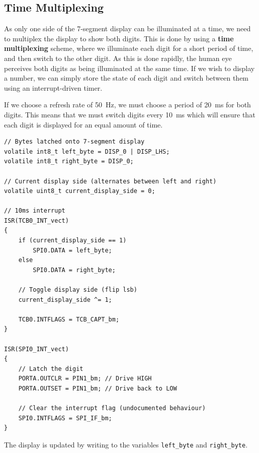 \documentclass[a4paper]{report}
\begin{document}
\subsection{Time Multiplexing}
As only one side of the 7-segment display can be illuminated at a time, we need to multiplex the display to show both digits.
This is done by using a \textbf{time multiplexing} scheme, where we illuminate each digit for a short period of time, and then switch to the other digit.
As this is done rapidly, the human eye perceives both digits as being illuminated at the same time. If we wish to display a number, we can simply
store the state of each digit and switch between them using an interrupt-driven timer.

If we choose a refresh rate of \qty{50}{Hz}, we must choose a period of \qty{20}{ms} for both digits. This means that we must switch digits every \qty{10}{ms}
which will ensure that each digit is displayed for an equal amount of time.
\begin{verbatim}
// Bytes latched onto 7-segment display
volatile int8_t left_byte = DISP_0 | DISP_LHS;
volatile int8_t right_byte = DISP_0;

// Current display side (alternates between left and right)
volatile uint8_t current_display_side = 0;

// 10ms interrupt
ISR(TCB0_INT_vect)
{
    if (current_display_side == 1)
        SPI0.DATA = left_byte;
    else
        SPI0.DATA = right_byte;

    // Toggle display side (flip lsb)
    current_display_side ^= 1;

    TCB0.INTFLAGS = TCB_CAPT_bm;
}

ISR(SPI0_INT_vect)
{
    // Latch the digit
    PORTA.OUTCLR = PIN1_bm; // Drive HIGH
    PORTA.OUTSET = PIN1_bm; // Drive back to LOW

    // Clear the interrupt flag (undocumented behaviour)
    SPI0.INTFLAGS = SPI_IF_bm;
}
\end{verbatim}
The display is updated by writing to the variables \texttt{left_byte} and \texttt{right_byte}.
\end{document}
